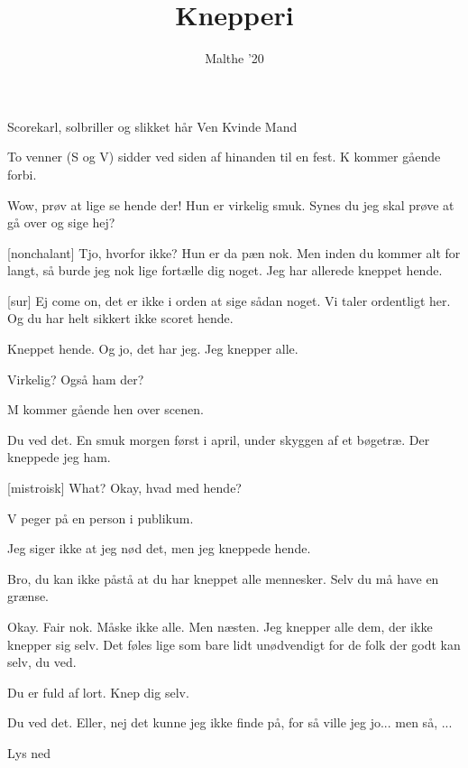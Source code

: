 \documentclass[a4paper,11pt]{article}
\title{Knepperi}
\author{Malthe '20}
\begin{document}
\maketitle

\begin{roles}
 Scorekarl, solbriller og slikket hår 
 Ven
 Kvinde
 Mand



\end{roles}



\begin{sketch}


\scene To venner (S og V) sidder ved siden af hinanden til en fest. K kommer gående forbi.

 Wow, prøv at lige se hende der! Hun er virkelig smuk. Synes du jeg skal prøve at gå over og sige hej?

[nonchalant] Tjo, hvorfor ikke? Hun er da pæn nok. Men inden du kommer alt for langt, så burde jeg nok lige fortælle dig noget. Jeg har allerede kneppet hende.

[sur] Ej come on, det er ikke i orden at sige sådan noget. Vi taler ordentligt her. Og du har helt sikkert ikke scoret hende. 

 Kneppet hende. Og jo, det har jeg. Jeg knepper alle.

  Virkelig? Også ham der? 

\scene M kommer gående hen over scenen.

 Du ved det. En smuk morgen først i april, under skyggen af et bøgetræ. Der kneppede jeg ham.

[mistroisk] What? Okay, hvad med hende? 

\scene V peger på en person i publikum.

 Jeg siger ikke at jeg nød det, men jeg kneppede hende.

 Bro, du kan ikke påstå at du har kneppet alle mennesker. Selv du må have en grænse.

 Okay. Fair nok. Måske ikke alle. Men næsten. Jeg knepper alle dem, der ikke knepper sig selv. Det føles lige som bare lidt unødvendigt for de folk der godt kan selv, du ved.

 Du er fuld af lort. Knep dig selv.

 Du ved det. Eller, nej det kunne jeg ikke finde på, for så ville jeg jo... men så, ...

\scene Lys ned





\end{sketch}
\end{document}
